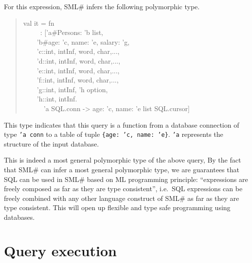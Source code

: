 \documentclass{jbook}
\newcommand{\txt}[2]{#2}
\newcommand{\smlsharp}{SML\#}
\newcommand{\myem}{\mbox{\ \ }}
\newenvironment{program}{\begin{quote}\begin{tt}}%
                        {\end{tt}\end{quote}}
\begin{document}
	For this expression, \smlsharp{} infers the following
polymorphic type.
\begin{program}
val it = fn
\\\myem\ \ \    : ['a\#{Persons: 'b list},
\\\myem\myem     'b\#{age: 'c, name: 'e, salary: 'g},
\\\myem\myem     'c::{int, intInf, word, char,...},
\\\myem\myem     'd::{int, intInf, word, char,...},
\\\myem\myem     'e::{int, intInf, word, char,...},
\\\myem\myem     'f::{int, intInf, word, char,...},
\\\myem\myem     'g::{int, intInf, 'h option},
\\\myem\myem     'h::{int, intInf}.
\\\myem\myem\myem       'a SQL.conn -> {age: 'c, name: 'e} list SQL.cursor]
\end{program}
	This type indicates that this query is a function from a database
connection of type {\tt  'a conn} to a table of tuple {\tt \{age: 'c,
name: 'e\}}.
	{\tt 'a} represents the structure of the input database.
	
	This is indeed a most general polymorphic type of the above
query,
	By the fact that \smlsharp{} can infer a most general
polymorphic type, we are guarantees that SQL can be used in \smlsharp{}
based on ML programming principle: ``expressions are freely
composed as far as they are type consistent'', i.e.\ 
SQL expressions can be freely combined with any other language construct
of \smlsharp{} as far as they are type consistent.
	This will open up flexible and type safe programming using
databases.

\fi%

\section{\txt{問い合わせの実行}{Query execution}}
\label{sec:tutorialExecutingSQL}
\end{document}
